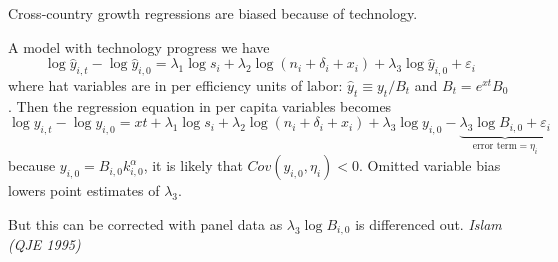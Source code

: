 Cross-country growth regressions are biased because of technology.

A model with technology progress we have \[
    \log \hat{y}_{i,t} - \log\hat{y}_{i,0} = \lambda_1 \log s_i + \lambda_2 \log(n_i + \delta_i + x_i) + \lambda_3 \log\hat{y}_{i,0} + \varepsilon_i
\] where hat variables are in per efficiency units of labor: $\hat{y}_t \equiv y_t/B_t$ and $B_t = e^{xt}B_0$.
Then the regression equation in per capita variables becomes \[
    \log y_{i,t} - \log y_{i,0} = xt + \lambda_1\log s_i + \lambda_2\log(n_i+\delta_i+x_i) + \lambda_3\log y_{i,0} - \underbrace{\lambda_3 \log B_{i,0} + \varepsilon_i}_{\text{error term} = \eta_i}
\] because $y_{i,0} = B_{i,0}k_{i,0}^{\alpha}$, it is likely that {$Cov(y_{i,0},\eta_i)<0$. Omitted variable bias lowers point estimates of $\lambda_3$}.

{But this can be corrected with panel data as $\lambda_3 \log B_{i,0}$ is differenced out. \textit{Islam (QJE 1995)}
}

